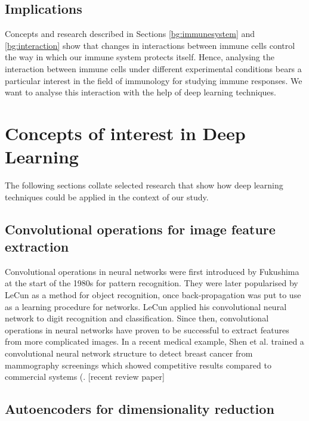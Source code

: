 \subsection{Implications}

Concepts and research described in Sections \ref{bg:immunesystem} and \ref{bg:interaction} show that changes in interactions between immune cells control the way in which our immune system protects itself. Hence, analysing the interaction between immune cells under different experimental conditions bears a particular interest in the field of immunology for studying immune responses. We want to analyse this interaction with the help of deep learning techniques.

\section{Concepts of interest in Deep Learning}

The following sections collate selected research that show how deep learning techniques could be applied in the context of our study.

\subsection{Convolutional operations for image feature extraction}

Convolutional operations in neural networks were first introduced by Fukushima at the start of the 1980s for pattern recognition. They were later popularised by LeCun as a method for object recognition, once back-propagation was put to use as a learning procedure for networks. LeCun applied his convolutional neural network to digit recognition and classification. Since then, convolutional operations in neural networks have proven to be successful to extract features from more complicated images. In a recent medical example, Shen et al. trained a convolutional neural network structure to detect breast cancer from mammography screenings which showed competitive results compared to commercial systems (\cite{https://www.nature.com/articles/s41598-019-48995-4}.
[recent review paper]

\subsection{Autoencoders for dimensionality reduction}

